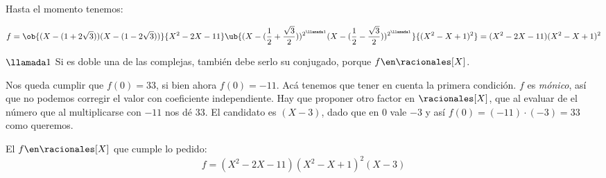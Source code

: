 Hasta el momento tenemos:\par
$$
f =
\ob{(X - (1+2\sqrt{3})) (X - (1-2\sqrt{3}))}{X^2 - 2X - 11}
\ub{(X - (\frac{1}{2} + \frac{\sqrt{3}}{2}))^{2^{\llamada1}}
(X - (\frac{1}{2} - \frac{\sqrt{3}}{2}))^{2^{\llamada1}}}{(X^2 - X + 1)^2} =
(X^2 - 2X - 11)(X^2 - X + 1)^2
$$

$\llamada1$ Si es doble una de las complejas, también debe serlo su conjugado, porque
$f\en \racionales[X]$.\bigskip

Nos queda cumplir que $f(0) = 33$, si bien ahora $f(0) = -11$. Acá tenemos que tener en cuenta
la primera condición. $f$ es \textit{mónico}, así que no podemos corregir el valor con coeficiente independiente.
Hay que proponer otro factor en $\racionales[X]$, que al evaluar de el número que al multiplicarse con $-11$ nos dé
33. El candidato es $(X-3)$, dado que en 0 vale $-3$ y así $f(0) = (-11) \cdot (-3) = 33$ como queremos.\par

El $f \en\racionales[X]$ que cumple lo pedido:
$$
\boxed{f = (X^2 - 2X - 11)(X^2 - X + 1)^2(X-3)}
$$



